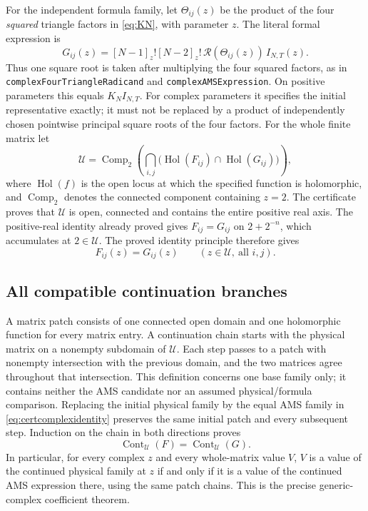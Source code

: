 \documentclass[10pt,a4paper]{article}
\newcommand{\lean}[1]{{\small\nolinkurl{#1}}}
\newenvironment{revision}{\begingroup}{\endgroup}
\begin{document}
\begin{revision}
For the independent formula family, let $\Theta_{ij}(z)$ be the
product of the four \emph{squared} triangle factors in \eqref{eq:KN},
with parameter $z$. The literal formal expression is
\begin{equation}\label{eq:complexgroupedroot}
 G_{ij}(z)=[N-1]_z![N-2]_z!\,
                \mathcal R(\Theta_{ij}(z))\,I_{N,T}(z).
\end{equation}
Thus one square root is taken after multiplying the four squared factors,
as in \lean{complexFourTriangleRadicand} and
\lean{complexAMSExpression}. On positive parameters this equals $K_NI_{N,T}$.
For complex parameters it specifies the initial representative exactly;
it must not be replaced by a product of independently chosen pointwise
principal square roots of the four factors. For the whole finite matrix let
\begin{equation}\label{eq:certbranch}
 \mathcal U=\operatorname{Comp}_{2}\!\left(
  \bigcap_{i,j}\bigl(\operatorname{Hol}(F_{ij})
                         \cap\operatorname{Hol}(G_{ij})\bigr)\right),
\end{equation}
where $\operatorname{Hol}(f)$ is the open locus at which the specified
function is holomorphic, and $\operatorname{Comp}_{2}$ denotes the connected
component containing $z=2$. The certificate proves that $\mathcal U$ is
open, connected and contains the entire positive real axis.
The positive-real identity already proved gives $F_{ij}=G_{ij}$ on
$2+2^{-n}$, which accumulates at $2\in\mathcal U$.
The proved identity principle therefore gives
\begin{equation}\label{eq:certcomplexidentity}
 F_{ij}(z)=G_{ij}(z)\qquad(z\in\mathcal U,\ \text{all }i,j).
\end{equation}

\subsection{All compatible continuation branches}
A matrix patch consists of one connected open domain and one holomorphic
function for every matrix entry. A continuation chain starts with the physical matrix on a nonempty
subdomain of $\mathcal U$. Each step passes to a patch with nonempty
intersection with the previous domain, and the two matrices agree
throughout that intersection.
This definition concerns one base family only; it contains neither the
AMS candidate nor an assumed physical/formula comparison.
Replacing the initial physical family by the equal AMS family in
\eqref{eq:certcomplexidentity} preserves the same initial patch and every
subsequent step. Induction on the chain in both directions proves
\begin{equation}\label{eq:certcontinuations}
 \operatorname{Cont}_{\mathcal U}(F)=\operatorname{Cont}_{\mathcal U}(G).
\end{equation}
In particular, for every complex $z$ and every whole-matrix value $V$,
$V$ is a value of the continued physical family at $z$ if and only if it
is a value of the continued AMS expression there, using the same patch
chains. This is the precise generic-complex coefficient theorem.


\end{revision}
\end{document}
